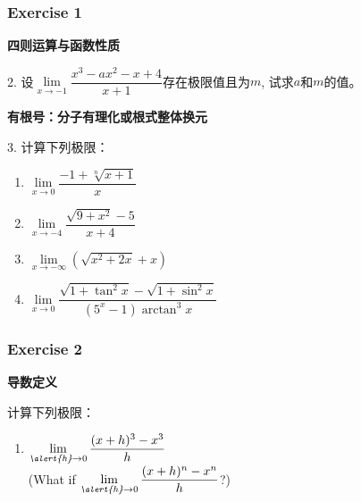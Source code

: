 \begin{frame}
	\frametitle{Exercise 1}
	\textbf{四则运算与函数性质}

	\vspace*{1em}

	2. 设$\lim \limits_{x \to -1} \dfrac{x^3-ax^2-x+4}{x+1}$存在极限值且为$m$, 试求$a$和$m$的值。

	\vspace*{2em}

	\textbf{有根号：分子有理化或根式整体换元}

	\vspace*{1em}

	3. 计算下列极限：
	\begin{enumerate}
		\item  $\lim\limits_{\textit{x} \to 0}\dfrac{-1+\sqrt[n]{x+1}}{x}$
		\item  $\lim\limits_{\textit{x} \to -4}\dfrac{\sqrt{9+x^{2}}-5}{x+4}$
		\item  $\lim \limits_{\textit{x} \to -\infty}(\sqrt{x^2+2x}+x)$
		\item  $\lim \limits_{\textit{x} \to 0}\dfrac{\sqrt{1+\tan^2{x}}-\sqrt{1+\sin^2{x}}}{(5^x-1)\arctan^3{x}}$

	\end{enumerate}
\end{frame}



\begin{frame}
	\frametitle{Exercise 2}
	\textbf{导数定义}

	\vspace*{1em}

	计算下列极限：
	\begin{enumerate}
		\item $\lim\limits_{\textit{\alert{h}} \to 0}\dfrac{(x+h)^{3}-x^{3}}{h}$\\
		      (What if $\lim\limits_{\textit{\alert{h}} \to 0}\dfrac{(x+h)^{n}-x^{n}}{h}$?)

	\end{enumerate}
	\vspace*{1em}
\end{frame}


